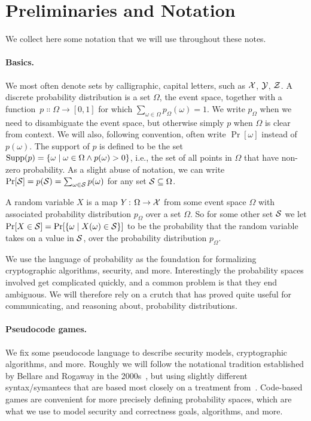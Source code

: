 \section{Preliminaries and Notation}
\label{sec:notation}

We collect here some notation that we will use throughout these notes. 


\paragraph{Basics.}
We most often denote sets by calligraphic, capital letters, such as ${\cal X}$,
${\cal Y}$, $\mathcal{Z}$. A discrete probability distribution is a set $\Omega$, the
event space, together with a
function~$p\Colon\Omega\rightarrow[0,1]$ for which $\sum_{\omega\in\Omega}
p_\Omega(\omega) = 1$.
We write $p_\Omega$ when we need to disambiguate the event space, but
otherwise simply $p$ when $\Omega$ is clear from context. We will also,
following convention, often write $\Pr[\omega]$ instead of $p(\omega)$.
The support of $p$ is defined to be the set $\textnormal{Supp}(p) = \{\omega \;|\; \omega
\in \Omega \land p(\omega) > 0\}$, 
i.e., the set of all points in $\Omega$ that have non-zero probability.  
As a slight abuse of notation, we can write 
$\Pr[{\cal S}] = p({\cal S}) = \sum_{\omega\in{\cal S}} p(\omega)$ for any set ${\cal S} \subseteq \Omega$. 

A random variable $X$ is a map $Y{{\kern .05em}\colon{\kern .05em}}\Omega\rightarrow{\cal X}$ from some event
space $\Omega$ with associated probability distribution $p_\Omega$ over a  set
$\Omega$. So for some other set ${\cal S}$ we let $\Pr[X\in{\cal S}] = \Pr[\{\omega
\;|\; X(\omega) \in {\cal S}\}]$ to be the probability that the random variable
takes on a value in ${\cal S}$, over the probability distribution $p_\Omega$.

We use the language of probability as the foundation for formalizing
cryptographic algorithms, security, and more. Interestingly the probability
spaces involved get complicated quickly, and a common problem is that they end 
ambiguous. We will therefore rely on a crutch that has proved quite useful for
communicating, and reasoning about, probability distributions.


\paragraph{Pseudocode games.} We fix some pseudocode language to describe
security models, cryptographic algorithms, and more. Roughly we will follow the
notational tradition established by Bellare and Rogaway in the
2000s~\autocite{bellare2006security}, but using slightly different syntax/symantecs that are
based most closely on a treatment from~\autocite{ristenpart2011careful}.  Code-based
games are convenient for more precisely defining probability spaces, which are
what we use to model security and correctness goals, algorithms, and more.  

